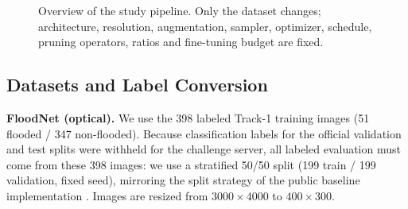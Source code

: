 \documentclass[conference]{IEEEtran}
\newif\ifreview
\newcommand{\REV}[1]{\ifreview\textcolor{red}{\textbf{[Revise: #1]}}\fi}
\begin{document}
\begin{figure}[t]
\centering
{}
\caption{Overview of the study pipeline. Only the dataset changes;
architecture, resolution, augmentation, sampler, optimizer, schedule,
pruning operators, ratios and fine-tuning budget are fixed.}
\label{fig:pipeline}
\end{figure}
\REV{[A6] DRAFT pipeline figure above (TikZ). Student: refine it --
add the sparsity ratios under ``Pruning'', the seeds, and a dashed box
showing ``dense baseline of the same seed''. A cleaner diagram drawn
in draw.io/PowerPoint exported as PDF is also fine. Must be referenced
in the text of Section III.}

\subsection{Datasets and Label Conversion}
\textbf{FloodNet (optical).} We use the 398 labeled Track-1 training
images (51 flooded / 347 non-flooded). Because classification labels
for the official validation and test splits were withheld for the
challenge server, all labeled evaluation must come from these 398
images: we use a stratified 50/50 split (199 train / 199 validation,
fixed seed), mirroring the split strategy of the public baseline
implementation \cite{khose2021semisupervised}. Images are resized from
$3000\times4000$ to $400\times300$.
\REV{[A9] Check orientation: are images $4000\times3000$ (W$\times$H)
and is $400\times300$ also W$\times$H? Say ``W$\times$H'' explicitly.
Also note the aspect ratio of Sen1Floods11 chips ($1{:}1$) is changed
by the resize to $4{:}3$ -- mention or justify.}
\end{document}
